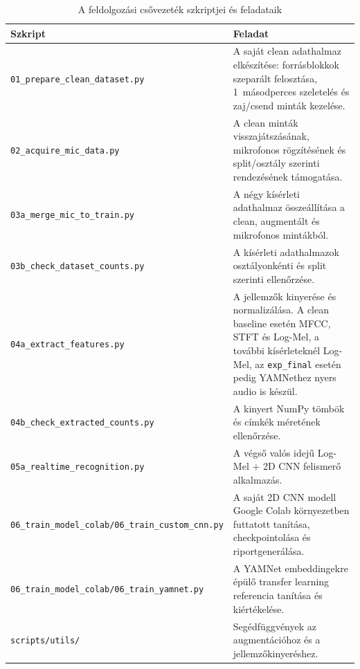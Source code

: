 \begin{table}[ht!]
\centering
\small
\caption{A feldolgozási csővezeték szkriptjei és feladataik}
\label{tab:pipeline_scripts}
\begin{tabular}{p{5.8cm}p{8.7cm}}
\toprule
\textbf{Szkript} & \textbf{Feladat} \\
\midrule
\texttt{01\_prepare\_\allowbreak clean\_\allowbreak dataset.py} & A saját clean adathalmaz elkészítése: forrásblokkok szeparált felosztása, 1~másodperces szeletelés és zaj/csend minták kezelése. \\
\texttt{02\_acquire\_\allowbreak mic\_\allowbreak data.py} & A clean minták visszajátszásának, mikrofonos rögzítésének és split/osztály szerinti rendezésének támogatása. \\
\texttt{03a\_merge\_\allowbreak mic\_\allowbreak to\_\allowbreak train.py} & A négy kísérleti adathalmaz összeállítása a clean, augmentált és mikrofonos mintákból. \\
\texttt{03b\_check\_\allowbreak dataset\_\allowbreak counts.py} & A kísérleti adathalmazok osztályonkénti és split szerinti ellenőrzése. \\
\texttt{04a\_extract\_\allowbreak features.py} & A jellemzők kinyerése és normalizálása. A clean baseline esetén MFCC, STFT és Log-Mel, a további kísérleteknél Log-Mel, az \texttt{exp\_final} esetén pedig YAMNethez nyers audio is készül. \\
\texttt{04b\_check\_\allowbreak extracted\_\allowbreak counts.py} & A kinyert NumPy tömbök és címkék méretének ellenőrzése. \\
\texttt{05a\_realtime\_\allowbreak recognition.py} & A végső valós idejű Log-Mel + 2D CNN felismerő alkalmazás. \\
\texttt{06\_train\_\allowbreak model\_\allowbreak colab/06\_train\_\allowbreak custom\_\allowbreak cnn.py} & A saját 2D CNN modell Google Colab környezetben futtatott tanítása, checkpointolása és riportgenerálása. \\
\texttt{06\_train\_\allowbreak model\_\allowbreak colab/06\_train\_\allowbreak yamnet.py} & A YAMNet embeddingekre épülő transfer learning referencia tanítása és kiértékelése. \\
\texttt{scripts/utils/} & Segédfüggvények az augmentációhoz és a jellemzőkinyeréshez. \\
\bottomrule
\end{tabular}
\end{table}

\clearpage
